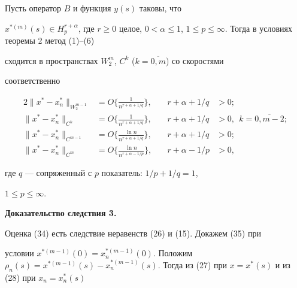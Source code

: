 \begin{cor}


Пусть оператор $B$ и функция $y(s) $ таковы, что


$x^{*(m)}(s) \in H_{p}^{r + \alpha} $, где $r \geq 0$ целое, $0 < \alpha


\leq 1$, $1 \leq p \leq \infty$. Тогда в условиях теоремы 2 метод (1)--(6)


сходится в пространствах $W_2^m$, $C^k$ ($k=\overline{0,m}$) со скоростями


соответственно


\begin{alignat*}{2}


\| x^* - x_n^* \|_{W_2^{m-1}} &=O \bigg\lbrace \frac{1}{n^{r +


\alpha + 1/q}} \bigg\rbrace, &\quad r + \alpha + 1/q &> 0; \\


%


\| x^* - x_n^* \|_{C^k} &=O \bigg\lbrace \frac{1}{n^{r + \alpha


 + 1/q}} \bigg\rbrace, &\quad r + \alpha + 1/q &> 0 ,\ \ k=\overline{0,m-2}; \\


%


\| x^* - x_n^* \|_{C^{m-1}} &=O \bigg\lbrace \frac{


\ln n}{n^{r + \alpha + 1/q}} \bigg\rbrace, &\quad r + \alpha + 1/q &> 0; \\


%


\| x^* - x_n^* \|_{C^m} &=O \bigg\lbrace \frac{\ln


 n}{n^{r + \alpha - 1/p}} \bigg\rbrace, &\quad r + \alpha - 1/p &> 0,


\end{alignat*}


где $q$ --- сопряженный с $p$ показатель: $ 1/p + 1/q=1$,


$1 \leq p \leq \infty $.


\end{cor}








{\bf Доказательство следствия 3.}


Оценка (34) есть следствие неравенств (26) и (15). Докажем (35) при


условии $x^{*(m-1)}(0)=x_n^{*(m-1)}(0) $. Положим $ \rho_n(s)=x^{*(m-1)}(s) -


x_n^{*(m-1)}(s) $. Тогда из (27) при $ x=x^*(s) $ и из (28) при $ x_n=x_n^*(s)$


